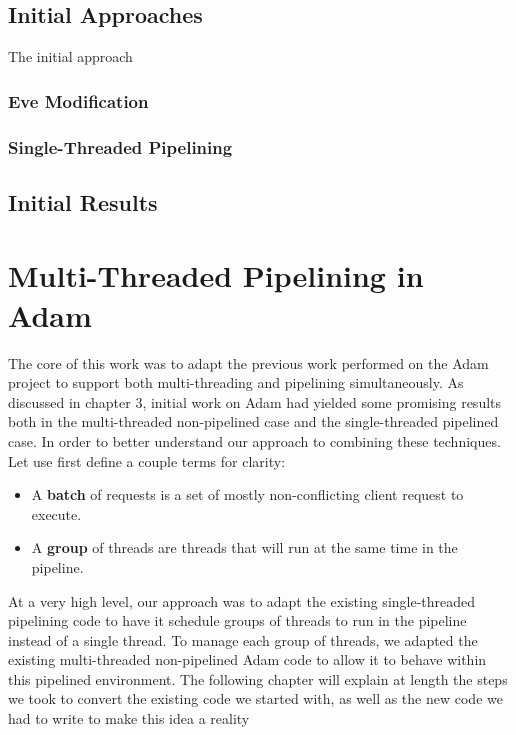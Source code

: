 \documentclass[11pt, oneside]{report}
\begin{document}
\section{Initial Approaches}

The initial approach 

\subsection{Eve Modification}

\subsection{Single-Threaded Pipelining}

\section{Initial Results}

\chapter{Multi-Threaded Pipelining in Adam}

The core of this work was to adapt the previous work performed on the Adam project to support both multi-threading and pipelining simultaneously. As discussed in chapter 3, initial work on Adam had yielded some promising results both in the multi-threaded non-pipelined case and the single-threaded pipelined case. In order to better understand our approach to combining these techniques. Let use first define a couple terms for clarity:
\begin{itemize}
\item A \textbf{batch} of requests is a set of mostly non-conflicting client request to execute.
\item A \textbf{group} of threads are threads that will run at the same time in the pipeline.
\end{itemize}

At a very high level, our approach was to adapt the existing single-threaded pipelining code to have it schedule groups of threads to run in the pipeline instead of a single thread. To manage each group of threads, we adapted the existing multi-threaded non-pipelined Adam code to allow it to behave within this pipelined environment. The following chapter will explain at length the steps we took to convert the existing code we started with, as well as the new code we had to write to make this idea a reality
\end{document}
